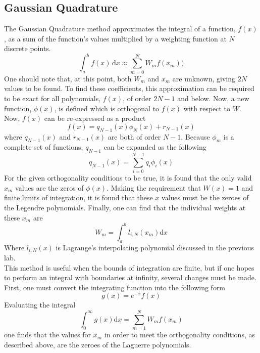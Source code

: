 \documentclass[12pt]{article}
\begin{document}
\subsection{Gaussian Quadrature}
The Gaussian Quadrature method approximates the integral of a function, $f(x)$, as a sum of the function's values multiplied by a weighting function at $N$ discrete points.
\begin{equation}
\label{GaussLeg}
\int_{a}^{b} \! f(x) \, \mathrm{d} x \approx \sum_{m=0}^N W_mf(x_m))
\end{equation}
One should note that, at this point, both $W_m$ and $x_m$ are unknown, giving $2N$ values to be found.  To find these coefficients, this approximation can be required to be exact for all polynomials, $f(x)$, of order $2N-1$ and below.  Now, a new function, $\phi(x)$, is defined which is orthogonal to $f(x)$ with respect to $W$.  Now, $f(x)$ can be re-expressed as a product
\begin{equation}
\label{fLeg}
f(x) = q_{N-1}(x)\phi_N(x)+r_{N-1}(x)
\end{equation}
where $q_{N-1}(x)$ and $r_{N-1}(x)$ are both of order $N-1$.  Because $\phi_m$ is a complete set of functions, $q_{N-1}$ can be expanded as the following
\begin{equation}
\label{qLeg}
q_{N-1}(x)=\sum_{i=0}^{N-1}q_i\phi_i(x)
\end{equation}
For the given orthogonality conditions to be true, it is found that the only valid $x_m$ values are the zeros of $\phi(x)$.  Making the requirement that $W(x)=1$ and finite limits of integration, it is found that these $x$ values must be the zeroes of the Legendre polynomials.  Finally, one can find that the individual weights at these $x_m$ are
\begin{equation}
\label{Wm}
W_m=\int_a^b l_{i,N}(x_m) \mathrm{d}x
\end{equation}
Where $l_{i,N}(x)$ is Lagrange's interpolating polynomial discussed in the previous lab. \\
This method is useful when the bounds of integration are finite, but if one hopes to perform an integral with boundaries at infinity, several changes must be made.  First, one must convert the integrating function into the following form
\begin{equation}
\label{GausExpo}
g(x) = e^{-x}f(x)
\end{equation}
Evaluating the integral
\begin{equation}
\label{LagInt}
\int_0^{\infty} g(x) \mathrm{d}x = \sum_{m=1}^N W_m f(x_m)
\end{equation}
one finds that the values for $x_m$ in order to meet the orthogonality conditions, as described above, are the zeroes of the Laguerre polynomials.
\end{document}
